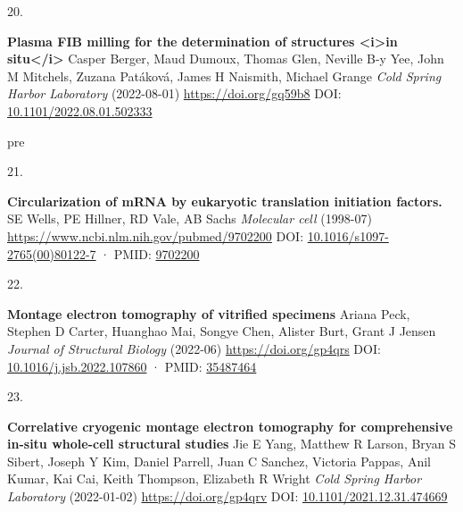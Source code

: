 \documentclass[
]{article}
\newlength{\cslhangindent}
\newlength{\csllabelwidth}
\newlength{\cslentryspacingunit} %
\newenvironment{CSLReferences}[2] %
 {%
  \setlength{\parindent}{0pt}
  \ifodd #1
  \let\oldpar\par
  \def\par{\hangindent=\cslhangindent\oldpar}
  \fi
  \setlength{\parskip}{#2\cslentryspacingunit}
 }%
 {}
\newcommand{\CSLBlock}[1]{#1\hfill\break}
\newcommand{\CSLLeftMargin}[1]{\parbox[t]{\csllabelwidth}{#1}}
\newcommand{\CSLRightInline}[1]{\parbox[t]{\linewidth - \csllabelwidth}{#1}\break}
\providecommand{\DIFaddtex}[1]{{\protect\color{blue}\uwave{#1}}} %
\providecommand{\DIFaddbegin}{} %
\providecommand{\DIFaddend}{} %
\providecommand{\DIFdelbegin}{} %
\providecommand{\DIFdelend}{} %
\providecommand{\DIFadd}[1]{\texorpdfstring{\DIFaddtex{#1}}{#1}} %
\newcommand{\DIFscaledelfig}{0.5}
\newlength{\DIFdelgraphicswidth} %
\newlength{\DIFdelgraphicsheight} %
\newcommand{\DIFaddincludegraphics}[2][]{{\color{blue}\fbox{\DIFOincludegraphics[#1]{#2}}}} %
\newcommand{\DIFdelincludegraphics}[2][]{%
\sbox{\DIFdelgraphicsbox}{\DIFOincludegraphics[#1]{#2}}%
\settoboxwidth{\DIFdelgraphicswidth}{\DIFdelgraphicsbox} %
\settoboxtotalheight{\DIFdelgraphicsheight}{\DIFdelgraphicsbox} %
\scalebox{\DIFscaledelfig}{%
\parbox[b]{\DIFdelgraphicswidth}{\usebox{\DIFdelgraphicsbox}\\[-\baselineskip] \rule{\DIFdelgraphicswidth}{0em}}\llap{\resizebox{\DIFdelgraphicswidth}{\DIFdelgraphicsheight}{%
\setlength{\unitlength}{\DIFdelgraphicswidth}%
\begin{picture}(1,1)%
\thicklines\linethickness{2pt} %
{\color[rgb]{1,0,0}\put(0,0){\framebox(1,1){}}}%
{\color[rgb]{1,0,0}\put(0,0){\line( 1,1){1}}}%
{\color[rgb]{1,0,0}\put(0,1){\line(1,-1){1}}}%
\end{picture}%
}\hspace*{3pt}}} %
} %
\DeclareRobustCommand{\DIFaddbegin}{\DIFOaddbegin \let\includegraphics\DIFaddincludegraphics} %
\DeclareRobustCommand{\DIFaddend}{\DIFOaddend \let\includegraphics\DIFOincludegraphics} %
\DeclareRobustCommand{\DIFdelbegin}{\DIFOdelbegin \let\includegraphics\DIFdelincludegraphics} %
\DeclareRobustCommand{\DIFdelend}{\DIFOaddend \let\includegraphics\DIFOincludegraphics} %
\begin{document}
\begin{CSLReferences}{0}{0}
\leavevmode\vadjust pre{\DIFdelbegin %
\DIFdelend \DIFaddbegin \hypertarget{ref-SDMGf7aG}{}\DIFaddend }%
\CSLLeftMargin{20. }%
\DIFaddbegin \CSLRightInline{\textbf{Plasma FIB milling for the determination of structures \textless i\textgreater in situ\textless/i\textgreater{}}
\CSLBlock{Casper Berger, Maud Dumoux, Thomas Glen, Neville B-y Yee, John M Mitchels, Zuzana Patáková, James H Naismith, Michael Grange} \emph{Cold Spring Harbor Laboratory} (2022-08-01) \url{https://doi.org/gq59b8}
\CSLBlock{DOI: \href{https://doi.org/10.1101/2022.08.01.502333}{10.1101/2022.08.01.502333}}}

\leavevmode\vadjust \DIFadd{pre}{\hypertarget{ref-cie13Q8F}{}}%
\CSLLeftMargin{21. }%
\DIFaddend \CSLRightInline{\textbf{Circularization of mRNA by eukaryotic translation initiation factors.}
\CSLBlock{SE Wells, PE Hillner, RD Vale, AB Sachs} \emph{Molecular cell} (1998-07) \url{https://www.ncbi.nlm.nih.gov/pubmed/9702200}
\CSLBlock{DOI: \href{https://doi.org/10.1016/s1097-2765(00)80122-7}{10.1016/s1097-2765(00)80122-7} · PMID: \href{https://www.ncbi.nlm.nih.gov/pubmed/9702200}{9702200}}}

\leavevmode{}%
\DIFdelbegin %
\DIFdelend \DIFaddbegin \CSLLeftMargin{22. }\DIFaddend %
\CSLRightInline{\textbf{Montage electron tomography of vitrified specimens}
\CSLBlock{Ariana Peck, Stephen D Carter, Huanghao Mai, Songye Chen, Alister Burt, Grant J Jensen} \emph{Journal of Structural Biology} (2022-06) \url{https://doi.org/gp4qrs}
\CSLBlock{DOI: \href{https://doi.org/10.1016/j.jsb.2022.107860}{10.1016/j.jsb.2022.107860} · PMID: \href{https://www.ncbi.nlm.nih.gov/pubmed/35487464}{35487464}}}

\leavevmode{}%
\DIFdelbegin %
\DIFdelend \DIFaddbegin \CSLLeftMargin{23. }\DIFaddend %
\CSLRightInline{\textbf{Correlative cryogenic montage electron tomography for comprehensive in-situ whole-cell structural studies}
\CSLBlock{Jie E Yang, Matthew R Larson, Bryan S Sibert, Joseph Y Kim, Daniel Parrell, Juan C Sanchez, Victoria Pappas, Anil Kumar, Kai Cai, Keith Thompson, Elizabeth R Wright} \emph{Cold Spring Harbor Laboratory} (2022-01-02) \url{https://doi.org/gp4qrv}
\CSLBlock{DOI: \href{https://doi.org/10.1101/2021.12.31.474669}{10.1101/2021.12.31.474669}}}


\end{CSLReferences}
\end{document}
